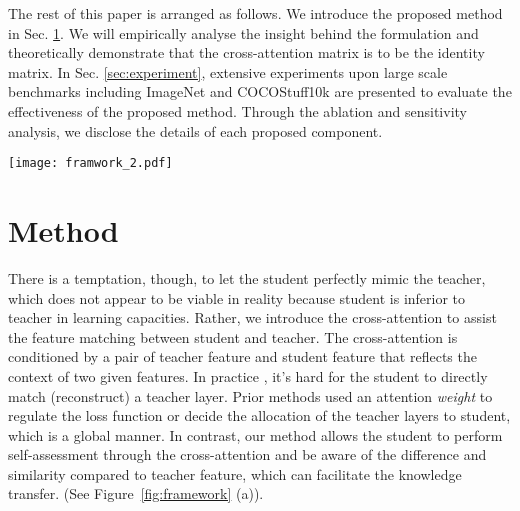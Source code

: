 \documentclass[10pt,twocolumn,letterpaper]{article}
\begin{document}
The rest of this paper is arranged as follows. We introduce the proposed method in Sec. \ref{sec:method}. We will empirically analyse the insight behind the formulation and theoretically demonstrate that the cross-attention matrix is to be the identity matrix. In Sec. \ref{sec:experiment}, extensive experiments upon large scale benchmarks including ImageNet and COCOStuff10k are presented to evaluate the effectiveness of the proposed method. Through the ablation and sensitivity analysis, we disclose the details of each proposed component.


\begin{figure*}[h]
  \centering
  \texttt{[image: framwork\_2.pdf]}
  \caption{Illustration of our framework.(a) \textbf{Self-assessment Distillation}. Given a pair of features of student and teacher, the cross-attention map $\rm{attn}$ is first computed and then applied on the student feature to generate the output $\rm{out}$, which is then asked to minimize the L$_2$ loss with the corresponding teacher feature. (b) \textbf{Anchor-point Distillation}. Each color indicates a region. We use average pooling to extract the \textit{anchor} within a local area of the given feature map, forming the new feature of smaller size. The generated anchor-point features will participate the self-assessment distillation. (c) \textbf{Sequence-level Distillation}. Both teacher and student features are to be sliced and rearranged as sequences. We use MHA heads to calculate the cross-attention for the later self-assessment distillation.}
  \label{fig:framework}
\end{figure*}

\section{Method}
\label{sec:method}
There is a temptation, though, to let the student perfectly mimic the teacher, which does not appear to be viable in reality because student is inferior to teacher in learning capacities. Rather, we introduce the cross-attention to assist the feature matching between student and teacher. The cross-attention is conditioned by a pair of teacher feature and student feature that reflects the context of two given features. In practice \cite{Cho2019OnTE,Ji2021ShowAA,Chen2020CrossLayerDW}, it's hard for the student to directly match (\ie reconstruct) a teacher layer. Prior methods used an attention \textit{weight} to regulate the loss function or decide the allocation of the teacher layers to student, which is a global manner. In contrast, our method allows the student to perform self-assessment through the cross-attention and be aware of the difference and similarity compared to teacher feature, which can facilitate the knowledge transfer. (See Figure~\ref{fig:framework} (a)).
\end{document}
